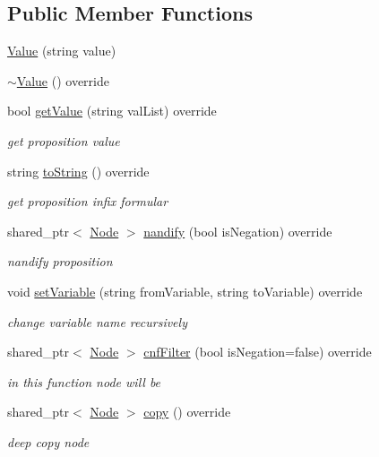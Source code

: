 \subsection*{Public Member Functions}
\begin{DoxyCompactItemize}
\item 
\hyperlink{class_value_a98e1dd185ea30f4e9343de03008fd622}{Value} (string value)
\item 
\hyperlink{class_value_a73578eb3c2fa9af8c62f836d1a3b0063}{$\sim$\+Value} () override
\item 
bool \hyperlink{class_value_ac956d02a49c773f5249cc31fb4293337}{get\+Value} (string val\+List) override
\begin{DoxyCompactList}\small\item\em get proposition value \end{DoxyCompactList}\item 
string \hyperlink{class_value_aa774521b29b4f0c77eb6d57b5a6fb3a0}{to\+String} () override
\begin{DoxyCompactList}\small\item\em get proposition infix formular \end{DoxyCompactList}\item 
shared\+\_\+ptr$<$ \hyperlink{class_node}{Node} $>$ \hyperlink{class_value_aaa2ddacd71ab25b50b06eee47e21289d}{nandify} (bool is\+Negation) override
\begin{DoxyCompactList}\small\item\em nandify proposition \end{DoxyCompactList}\item 
void \hyperlink{class_value_a807844066d6d76e9b9f3eda03cef37b1}{set\+Variable} (string from\+Variable, string to\+Variable) override
\begin{DoxyCompactList}\small\item\em change variable name recursively \end{DoxyCompactList}\item 
shared\+\_\+ptr$<$ \hyperlink{class_node}{Node} $>$ \hyperlink{class_value_a56c458de6a68b9a25233e6fdcfa67760}{cnf\+Filter} (bool is\+Negation=false) override
\begin{DoxyCompactList}\small\item\em in this function node will be \end{DoxyCompactList}\item 
shared\+\_\+ptr$<$ \hyperlink{class_node}{Node} $>$ \hyperlink{class_value_a45518c11045a76300ad02cc93a0150c9}{copy} () override
\begin{DoxyCompactList}\small\item\em deep copy node \end{DoxyCompactList}\end{DoxyCompactItemize}
